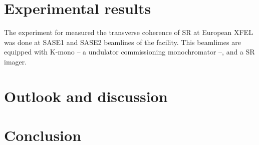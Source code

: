 \section{Experimental results}

    The experiment for measured the transverse coherence of SR at European XFEL was done at SASE1 and SASE2 beamlines of the facility. This beamlimes are equipped with K-mono -- a undulator commissioning monochromator --, and a SR imager. 
    
    
\section{Outlook and discussion}

\section{Conclusion}